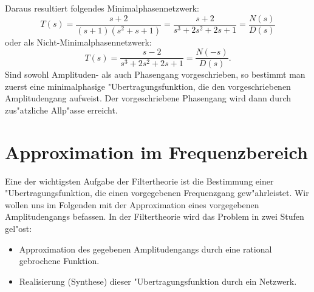 Daraus resultiert folgendes Minimalphasennetzwerk:
\begin{equation*}
T(s)=\frac{s+2}{(s+1)(s^{2}+s+1)}=\frac{s+2}{s^{3}+2s^{2}+2s+1}=\frac{N(s)}
     {D(s)}
\end{equation*}
oder als Nicht-Minimalphasennetzwerk:
\begin{equation*}
T(s)=\frac{s-2}{s^{3}+2s^{2}+2s+1}=\frac{N(-s)}{D(s)}.
\end{equation*}
Sind sowohl Amplituden- als auch Phasengang vorgeschrieben, so
bestimmt man zuerst eine minimalphasige "Ubertragungsfunktion, die den
vorgeschriebenen Amplitudengang aufweist. Der vorgeschriebene
Phasengang wird dann durch zus"atzliche Allp"asse erreicht.
\clearpage
\section{Approximation im Frequenzbereich}
Eine der wichtigsten Aufgabe der Filtertheorie
ist die Bestimmung einer "Ubertra\-gungs\-funk\-tion, die einen
vorgegebenen Frequenzgang gew"ahrleistet. Wir wollen uns im Folgenden
mit der Approximation eines vorgegebenen Amplitudengangs befassen. In
der Filtertheorie wird das Problem in zwei Stufen gel"ost: 
{\bf \begin{itemize}
\item Approximation des gegebenen Amplitudengangs durch eine rational gebrochene
      Funktion.
\item Realisierung (Synthese) dieser "Ubertragungsfunktion durch ein Netzwerk.
\end{itemize}
}
